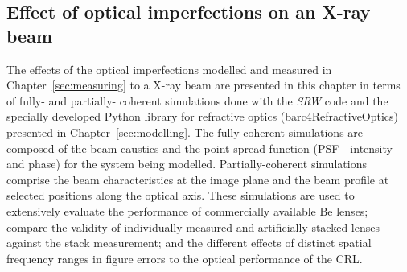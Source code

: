 \begin{refsection}
\chapter{Effect of optical imperfections on an X-ray beam}
\label{sec:effect_optical_imperfections}

The effects of the optical imperfections modelled and measured in Chapter~\ref{sec:measuring} to a X-ray beam are presented in this chapter in terms of fully- and partially- coherent simulations done with the \textit{SRW} code and the specially developed Python library for refractive optics (barc4RefractiveOptics) presented in Chapter~\ref{sec:modelling}. The fully-coherent simulations are composed of the beam-caustics and the point-spread function (PSF - intensity and phase) for the system being modelled. Partially-coherent simulations comprise the beam characteristics at the image plane and the beam profile at selected positions along the optical axis. These simulations are used to extensively evaluate the performance of commercially available Be lenses; compare the validity of individually measured and artificially stacked lenses against the stack measurement; and the different effects of distinct spatial frequency ranges in figure errors to the optical performance of the CRL.


\end{refsection}
